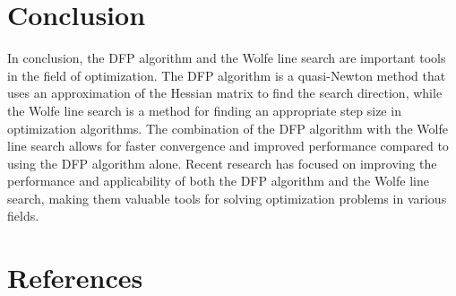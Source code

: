 \documentclass[12pt,a4paper,draft]{beamer}  %
\theoremstyle{definition}
\numberwithin{equation}{section}
\begin{document}
\section{Conclusion}
In conclusion, the DFP algorithm and the Wolfe line search are important tools in the field of
optimization. The DFP algorithm is a quasi-Newton method that uses an approximation of the Hessian matrix to find the search direction, while the Wolfe line search is a method for finding an appropriate step size in optimization algorithms. The combination of the DFP algorithm with the Wolfe line search allows for faster convergence and improved performance compared to using the DFP algorithm alone. Recent research has focused on improving the performance and applicability of both the DFP algorithm and the Wolfe line search, making them valuable tools for solving optimization problems in various fields.

\section{References}
\end{document}

